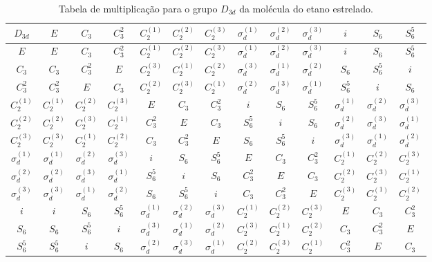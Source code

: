 \documentclass[a4paper,10pt]{article}
\begin{document}
\begin{table}[ht]
\caption{Tabela de multiplicação para o grupo $D_{3d}$ da molécula do etano estrelado.}
\centering


\begin{tabular} { |c|c c c c c c c c c c c c | }
\hline
$D_{3d}$ & $E$ & $C_3$ & $C_3^2$ & $C_2^{(1)}$ & $C_2^{(2)}$ & $C_2^{(3)}$ & $\sigma_d^{(1)}$ & $\sigma_d^{(2)}$ & $\sigma_d^{(3)}$ & $i$ & $S_6$ & $S_6^5$ \\
\hline
$E$ & $E$ & $C_3$ & $C_3^2$ & $C_2^{(1)}$ & $C_2^{(2)}$ & $C_2^{(3)}$ & $\sigma_d^{(1)}$ & $\sigma_d^{(2)}$ & $\sigma_d^{(3)}$ & $i$ & $S_6$ & $S_6^5$ \\
$C_3$ & $C_3$ & $C_3^2$ & $E$ & $C_2^{(3)}$ & $C_2^{(1)}$ & $C_2^{(2)}$ & $\sigma_d^{(3)}$ & $\sigma_d^{(1)}$ & $\sigma_d^{(2)}$ & $S_6$ & $S_6^5$ & $i$ \\
$C_3^2$ & $C_3^2$ & $E$ & $C_3$ & $C_2^{(2)}$ & $C_2^{(3)}$ & $C_2^{(1)}$ & $\sigma_d^{(2)}$ & $\sigma_d^{(3)}$ & $\sigma_d^{(1)}$ & $S_6^5$ & $i$ & $S_6$ \\
$C_2^{(1)}$ & $C_2^{(1)}$ & $C_2^{(2)}$ & $C_2^{(3)}$ & $E$ & $C_3$ & $C_3^2$ & $i$ & $S_6$ & $S_6^5$ & $\sigma_d^{(1)}$ & $\sigma_d^{(2)}$ & $\sigma_d^{(3)}$ \\
$C_2^{(2)}$ & $C_2^{(2)}$ & $C_2^{(3)}$ & $C_2^{(1)}$ & $C_3^2$ & $E$ & $C_3$ & $S_6^5$ & $i$ & $S_6$ & $\sigma_d^{(2)}$ & $\sigma_d^{(3)}$ & $\sigma_d^{(1)}$ \\
$C_2^{(3)}$ & $C_2^{(3)}$ & $C_2^{(1)}$ & $C_2^{(2)}$ & $C_3$ & $C_3^2$ & $E$ & $S_6$ & $S_6^5$ & $i$ & $\sigma_d^{(3)}$ & $\sigma_d^{(1)}$ & $\sigma_d^{(2)}$ \\
$\sigma_d^{(1)}$ & $\sigma_d^{(1)}$ & $\sigma_d^{(2)}$ & $\sigma_d^{(3)}$ & $i$ & $S_6$ & $S_6^5$ & $E$ & $C_3$ & $C_3^2$ & $C_2^{(1)}$ & $C_2^{(2)}$ & $C_2^{(3)}$ \\
$\sigma_d^{(2)}$ & $\sigma_d^{(2)}$ & $\sigma_d^{(3)}$ & $\sigma_d^{(1)}$ & $S_6^5$ & $i$ & $S_6$ & $C_3^2$ & $E$ & $C_3$ & $C_2^{(2)}$ & $C_2^{(3)}$ & $C_2^{(1)}$ \\
$\sigma_d^{(3)}$ & $\sigma_d^{(3)}$ & $\sigma_d^{(1)}$ & $\sigma_d^{(2)}$ & $S_6$ & $S_6^5$ & $i$ & $C_3$ & $C_3^2$ & $E$ & $C_2^{(3)}$ & $C_2^{(1)}$ & $C_2^{(2)}$ \\
$i$ & $i$ & $S_6$ & $S_6^5$ & $\sigma_d^{(1)}$ & $\sigma_d^{(2)}$ & $\sigma_d^{(3)}$ & $C_2^{(1)}$ & $C_2^{(2)}$ & $C_2^{(3)}$ & $E$ & $C_3$ & $C_3^2$ \\
$S_6$ & $S_6$ & $S_6^5$ & $i$ & $\sigma_d^{(3)}$ & $\sigma_d^{(1)}$ & $\sigma_d^{(2)}$ & $C_2^{(3)}$ & $C_2^{(1)}$ & $C_2^{(2)}$ & $C_3$ & $C_3^2$ & $E$ \\
$S_6^5$ & $S_6^5$ & $i$ & $S_6$ & $\sigma_d^{(2)}$ & $\sigma_d^{(3)}$ & $\sigma_d^{(1)}$ & $C_2^{(2)}$ & $C_2^{(3)}$ & $C_2^{(1)}$ & $C_3^2$ & $E$ & $C_3$ \\
\hline
\end{tabular}

\label{tab:mult_D3d}
\end{table}
\end{document}
